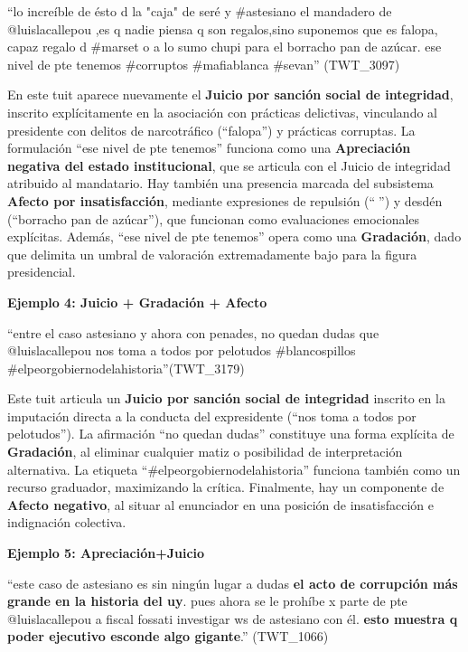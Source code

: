 \documentclass[spanish]{textolivre}
\begin{document}
“lo increíble de ésto d la "caja" de seré y \#astesiano el mandadero de @luislacallepou ,es q nadie piensa q son regalos,sino suponemos que es falopa, capaz regalo d \#marset o a lo sumo chupi para el borracho pan de azúcar. ese nivel de pte tenemos %
 \#corruptos \#mafiablanca \#sevan” (TWT\_3097)

En este tuit aparece nuevamente el \textbf{Juicio por sanción social de integridad}, inscrito explícitamente en la asociación con prácticas delictivas, vinculando al presidente con delitos de narcotráfico (“falopa”) y prácticas corruptas. La formulación “ese nivel de pte tenemos” funciona como una \textbf{Apreciación negativa del estado institucional}, que se articula con el Juicio de integridad atribuido al mandatario. Hay también una presencia marcada del subsistema \textbf{Afecto por insatisfacción}, mediante expresiones de repulsión (“{\Symbola 🤮}”) y desdén (“borracho pan de azúcar”), que funcionan como evaluaciones emocionales explícitas. Además, “ese nivel de pte tenemos” opera como una \textbf{Gradación}, dado que delimita un umbral de valoración extremadamente bajo para la figura presidencial.

\textbf{Ejemplo 4: Juicio + Gradación + Afecto}

“entre el caso astesiano y ahora con penades, no quedan dudas que @luislacallepou nos toma a todos por pelotudos  \#blancospillos  \#elpeorgobiernodelahistoria”(TWT\_3179)

Este tuit articula un \textbf{Juicio por sanción social de integridad} inscrito en la imputación directa a la conducta del expresidente (“nos toma a todos por pelotudos”). La afirmación “no quedan dudas” constituye una forma explícita de \textbf{Gradación}, al eliminar cualquier matiz o posibilidad de interpretación alternativa. La etiqueta “\#elpeorgobiernodelahistoria” funciona también como un recurso graduador, maximizando la crítica. Finalmente, hay un componente de \textbf{Afecto negativo}, al situar al enunciador en una posición de insatisfacción e indignación colectiva.

\textbf{Ejemplo 5: Apreciación+Juicio}

“este caso de astesiano es sin ningún lugar a dudas \textbf{el acto de corrupción más grande en la historia del uy}. pues ahora se le prohíbe x parte de pte @luislacallepou a fiscal fossati investigar ws de astesiano con él. \textbf{esto muestra q poder ejecutivo esconde algo gigante}.” (TWT\_1066)
\end{document}

